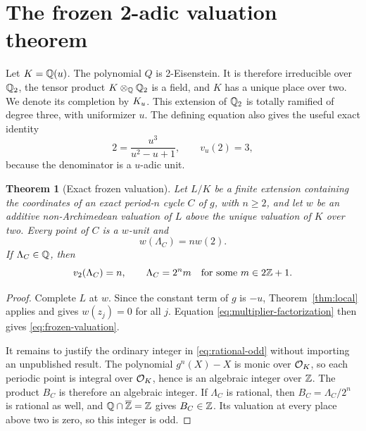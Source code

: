 \documentclass[11pt]{article}
\newtheorem{theorem}{Theorem}[section]
\theoremstyle{definition}
\theoremstyle{remark}
\begin{document}
\section{The frozen 2-adic valuation theorem}
\label{sec:frozen-theorem}

Let \(K=\mathbb{Q}(u)\).  The polynomial \(Q\) is 2-Eisenstein.  It is therefore
irreducible over \(\mathbb{Q}_2\), the tensor product \(K\otimes_{\mathbb{Q}}\mathbb{Q}_2\) is a
field, and \(K\) has a unique place over two.  We denote its completion by
\(K_u\).  This extension of \(\mathbb{Q}_2\) is totally ramified of degree three,
with uniformizer \(u\).  The defining equation also gives the useful exact
identity
\begin{equation}
  2=\frac{u^3}{u^2-u+1},
  \qquad v_u(2)=3,
  \label{eq:two-uniformizer}
\end{equation}
because the denominator is a \(u\)-adic unit.

\begin{theorem}[Exact frozen valuation]
\label{thm:frozen}
Let \(L/K\) be a finite extension containing the coordinates of an exact
period-\(n\) cycle \(C\) of \(g\), with \(n\ge2\), and let \(w\) be an
additive non-Archimedean valuation of \(L\) above the unique valuation of
\(K\) over two.  Every point of \(C\) is a \(w\)-unit
and
\begin{equation}
  w(\Lambda_C)=n w(2).
  \label{eq:frozen-valuation}
\end{equation}
If \(\Lambda_C\in\mathbb{Q}\), then
\begin{equation}
  v_2(\Lambda_C)=n,
  \qquad \Lambda_C=2^n m
  \quad\text{for some }m\in2\mathbb{Z}+1.
  \label{eq:rational-odd}
\end{equation}
\end{theorem}

\begin{proof}
Complete \(L\) at \(w\).  Since the constant term of \(g\) is
\(-u\), Theorem~\ref{thm:local} applies and gives
\(w(z_j)=0\) for all \(j\).  Equation
\eqref{eq:multiplier-factorization} then gives
\eqref{eq:frozen-valuation}.

It remains to justify the ordinary integer in \eqref{eq:rational-odd}
without importing an unpublished result.  The polynomial
\(g^n(X)-X\) is monic over \(\mathcal{O}_K\), so each periodic point is integral over
\(\mathcal{O}_K\), hence is an algebraic integer over \(\mathbb{Z}\).  The product
\(B_C\) is therefore an algebraic integer.  If \(\Lambda_C\) is rational,
then \(B_C=\Lambda_C/2^n\) is rational as well, and
\(\mathbb{Q}\cap\overline{\mathbb{Z}}=\mathbb{Z}\) gives \(B_C\in\mathbb{Z}\).  Its valuation at every
place above two is zero, so this integer is odd.
\end{proof}
\end{document}
